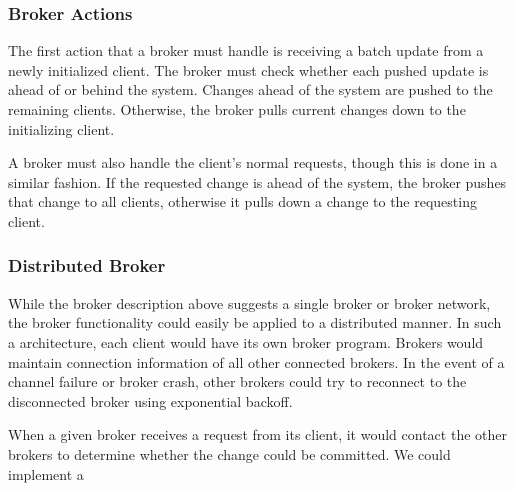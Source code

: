 \subsubsection{Broker Actions}
The first action that a broker must handle is
receiving a batch update from a newly initialized client.
The broker must check whether each pushed update
is ahead of or behind the system.
Changes ahead of the system are pushed to the remaining clients.
Otherwise, the broker pulls current changes down to the initializing client.

A broker must also handle the client's normal requests,
though this is done in a similar fashion.
If the requested change is ahead of the system,
the broker pushes that change to all clients,
otherwise it pulls down a change to the requesting client.

\subsubsection{Distributed Broker}
While the broker description above suggests a single broker or broker network,
the broker functionality could easily be applied to a distributed manner.
In such a architecture, each client would have its own broker program.
Brokers would maintain connection information of all other connected brokers.
In the event of a channel failure or broker crash,
other brokers could try to reconnect to the disconnected broker
using exponential backoff.


When a given broker receives a request from its client,
it would contact the other brokers to determine whether the change could be committed.
We could implement a 
